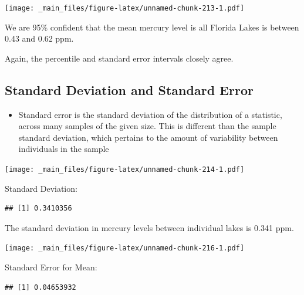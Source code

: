 \documentclass[]{book}
\newenvironment{Shaded}{\begin{snugshade}}{\end{snugshade}}
\newcommand{\KeywordTok}[1]{\textcolor[rgb]{0.13,0.29,0.53}{\textbf{#1}}}
\newcommand{\StringTok}[1]{\textcolor[rgb]{0.31,0.60,0.02}{#1}}
\newcommand{\OperatorTok}[1]{\textcolor[rgb]{0.81,0.36,0.00}{\textbf{#1}}}
\newcommand{\NormalTok}[1]{#1}
\providecommand{\tightlist}{%
  \setlength{\itemsep}{0pt}\setlength{\parskip}{0pt}}
\begin{document}
\texttt{[image: \_main\_files/figure-latex/unnamed-chunk-213-1.pdf]}

We are 95\% confident that the mean mercury level is all Florida Lakes
is between 0.43 and 0.62 ppm.

Again, the percentile and standard error intervals closely agree.

\subsection{Standard Deviation and Standard
Error}\label{standard-deviation-and-standard-error}

\begin{itemize}
\tightlist
\item
  Standard error is the standard deviation of the distribution of a
  statistic, across many samples of the given size. This is different
  than the sample standard deviation, which pertains to the amount of
  variability between individuals in the sample
\end{itemize}

\texttt{[image: \_main\_files/figure-latex/unnamed-chunk-214-1.pdf]}

Standard Deviation:

\begin{Shaded}
\end{Shaded}

\begin{verbatim}
## [1] 0.3410356
\end{verbatim}

The standard deviation in mercury levels between individual lakes is
0.341 ppm.

\texttt{[image: \_main\_files/figure-latex/unnamed-chunk-216-1.pdf]}

Standard Error for Mean:

\begin{Shaded}
\end{Shaded}

\begin{verbatim}
## [1] 0.04653932
\end{verbatim}
\end{document}
